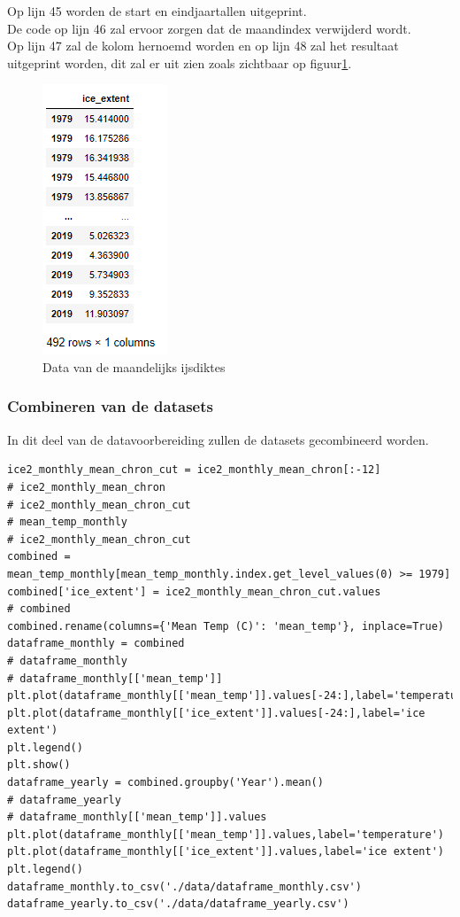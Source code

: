 Op lijn 45 worden de start en eindjaartallen uitgeprint. \\
De code op lijn 46 zal ervoor zorgen dat de maandindex verwijderd wordt.\\
Op lijn 47 zal de kolom hernoemd worden en op lijn 48 zal het resultaat uitgeprint worden, dit zal er uit zien zoals zichtbaar op figuur\ref{fig:iceextentdata}.

\begin{figure}
    \centering
    \caption{Data van de maandelijks ijsdiktes}
    \label{fig:iceextentdata}
    \includegraphics[width=0.3\linewidth]{ice_extent_data}
\end{figure}

\subsubsection{Combineren van de datasets}

In dit deel van de datavoorbereiding zullen de datasets gecombineerd worden.

\begin{verbatim}
ice2_monthly_mean_chron_cut = ice2_monthly_mean_chron[:-12]
# ice2_monthly_mean_chron
# ice2_monthly_mean_chron_cut
# mean_temp_monthly
# ice2_monthly_mean_chron_cut
combined = mean_temp_monthly[mean_temp_monthly.index.get_level_values(0) >= 1979]
combined['ice_extent'] = ice2_monthly_mean_chron_cut.values
# combined
combined.rename(columns={'Mean Temp (C)': 'mean_temp'}, inplace=True)
dataframe_monthly = combined
# dataframe_monthly
# dataframe_monthly[['mean_temp']]
plt.plot(dataframe_monthly[['mean_temp']].values[-24:],label='temperature')
plt.plot(dataframe_monthly[['ice_extent']].values[-24:],label='ice extent')
plt.legend()
plt.show()
dataframe_yearly = combined.groupby('Year').mean()
# dataframe_yearly
# dataframe_monthly[['mean_temp']].values
plt.plot(dataframe_monthly[['mean_temp']].values,label='temperature')
plt.plot(dataframe_monthly[['ice_extent']].values,label='ice extent')
plt.legend()
dataframe_monthly.to_csv('./data/dataframe_monthly.csv')
dataframe_yearly.to_csv('./data/dataframe_yearly.csv')
\end{verbatim}

